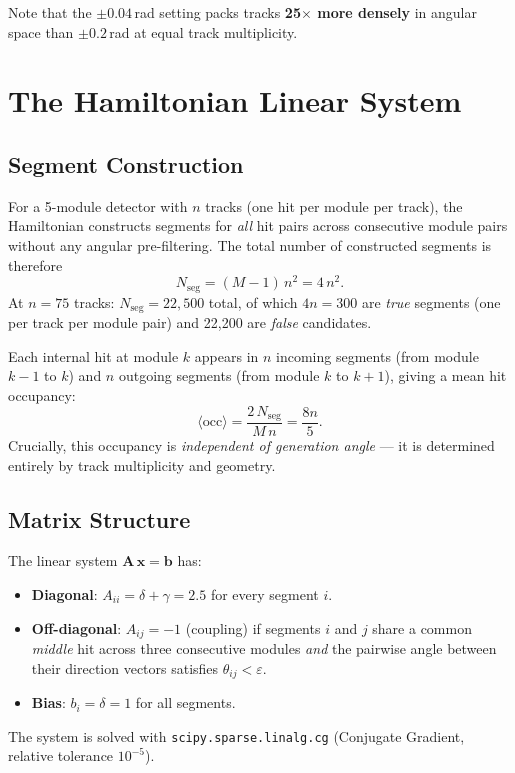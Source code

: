 \documentclass[12pt,a4paper]{article}
\newcommand{\eps}{\varepsilon}
\begin{document}
\noindent Note that the $\pm0.04$\,rad setting packs tracks
\textbf{25$\times$ more densely} in angular space than $\pm0.2$\,rad
at equal track multiplicity.

\section{The Hamiltonian Linear System}
\label{sec:hamiltonian}

\subsection{Segment Construction}
\label{sec:segments}

For a 5-module detector with $n$ tracks (one hit per module per track), the
Hamiltonian constructs segments for \emph{all} hit pairs across consecutive
module pairs without any angular pre-filtering.
The total number of constructed segments is therefore
\begin{equation}
  N_\text{seg} = (M-1)\,n^2 = 4\,n^2.
  \label{eq:nseg}
\end{equation}
At $n=75$ tracks: $N_\text{seg} = 22{,}500$ total, of which $4n = 300$ are
\emph{true} segments (one per track per module pair) and 22{,}200 are
\emph{false} candidates.

Each internal hit at module $k$ appears in $n$ incoming segments
(from module $k-1$ to $k$) and $n$ outgoing segments
(from module $k$ to $k+1$), giving a mean hit occupancy:
\begin{equation}
  \langle\text{occ}\rangle = \frac{2\,N_\text{seg}}{M\,n}
  = \frac{8n}{5}.
  \label{eq:occ}
\end{equation}
Crucially, this occupancy is \emph{independent of generation angle} — it is
determined entirely by track multiplicity and geometry.

\subsection{Matrix Structure}
\label{sec:matrix}

The linear system $\mathbf{A}\,\mathbf{x} = \mathbf{b}$ has:
\begin{itemize}
  \item \textbf{Diagonal}: $A_{ii} = \delta + \gamma = 2.5$ for every segment $i$.
  \item \textbf{Off-diagonal}: $A_{ij} = -1$ (coupling) if segments $i$ and $j$
    share a common \emph{middle} hit across three consecutive modules
    \emph{and} the pairwise angle between their direction vectors satisfies
    $\theta_{ij} < \eps$.
  \item \textbf{Bias}: $b_i = \delta = 1$ for all segments.
\end{itemize}
The system is solved with \texttt{scipy.sparse.linalg.cg} (Conjugate Gradient,
relative tolerance $10^{-5}$).
\end{document}
